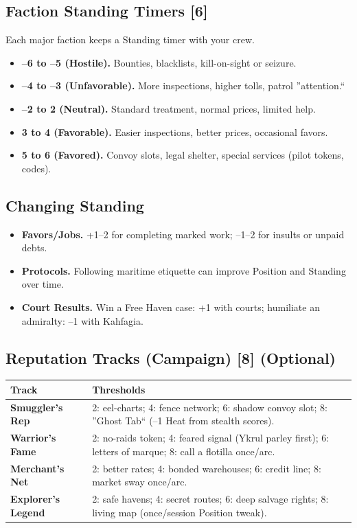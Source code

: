 \documentclass[11pt,oneside]{book}
\begin{document}
\subsection*{Faction Standing Timers [6]}
Each major faction keeps a Standing timer with your crew.
\begin{itemize}
  \item \textbf{--6 to --5 (Hostile).} Bounties, blacklists, kill-on-sight or seizure.
  \item \textbf{--4 to --3 (Unfavorable).} More inspections, higher tolls, patrol ''attention.``
  \item \textbf{--2 to 2 (Neutral).} Standard treatment, normal prices, limited help.
  \item \textbf{3 to 4 (Favorable).} Easier inspections, better prices, occasional favors.
  \item \textbf{5 to 6 (Favored).} Convoy slots, legal shelter, special services (pilot tokens, codes).
\end{itemize}

\subsection*{Changing Standing}
\begin{itemize}
  \item \textbf{Favors/Jobs.} +1--2 for completing marked work; --1--2 for insults or unpaid debts.
  \item \textbf{Protocols.} Following maritime etiquette can improve Position and Standing over time.
  \item \textbf{Court Results.} Win a Free Haven case: +1 with courts; humiliate an admiralty: --1 with Kahfagia.
\end{itemize}

\subsection*{Reputation Tracks (Campaign) [8] (Optional)}
\begin{tabularx}{\linewidth}{@{}p{3.2cm} X@{}}
\toprule
\textbf{Track} & \textbf{Thresholds}\\
\midrule
\textbf{Smuggler's Rep} & 2: eel-charts; 4: fence network; 6: shadow convoy slot; 8: ''Ghost Tab`` (--1 Heat from stealth scores).\\
\textbf{Warrior's Fame} & 2: no-raids token; 4: feared signal (Ykrul parley first); 6: letters of marque; 8: call a flotilla once/arc.\\
\textbf{Merchant's Net} & 2: better rates; 4: bonded warehouses; 6: credit line; 8: market sway once/arc.\\
\textbf{Explorer's Legend} & 2: safe havens; 4: secret routes; 6: deep salvage rights; 8: living map (once/session Position tweak).\\
\bottomrule
\end{tabularx}
\end{document}
